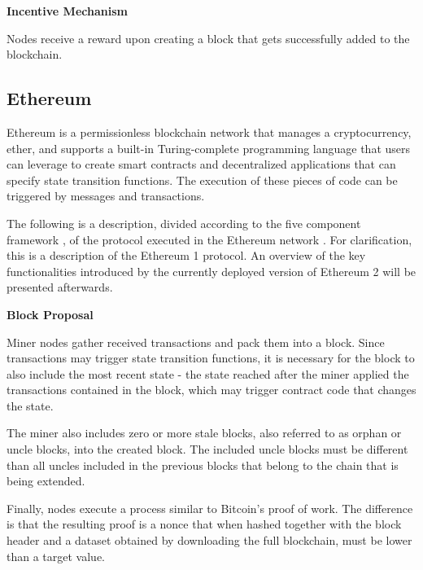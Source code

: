 \vspace{0.25cm}

\textbf{Incentive Mechanism}

Nodes receive a reward upon creating a block that gets successfully added to the blockchain.





\subsection{Ethereum}

Ethereum \cite{ethereum_whitepaper} \cite{ethereum_yellowpaper} is a permissionless blockchain network that manages a cryptocurrency, ether, and supports a built-in Turing-complete programming language that users can leverage to create smart contracts and decentralized applications that can specify state transition functions. The execution of these pieces of code can be triggered by messages and transactions.

The following is a description, divided according to the five component framework \cite{survey_bchain_networks}, of the protocol executed in the Ethereum network \cite{ethereum_whitepaper} \cite{ethereum_yellowpaper}. For clarification, this is a description of the Ethereum 1 protocol. An overview of the key functionalities introduced by the currently deployed version of Ethereum 2 \cite{eth2} will be presented afterwards.


\vspace{0.5cm}

\textbf{Block Proposal}

Miner nodes gather received transactions and pack them into a block. Since transactions may trigger state transition functions, it is necessary for the block to also include the most recent state - the state reached after the miner applied the transactions contained in the block, which may trigger contract code that changes the state.

The miner also includes zero or more stale blocks, also referred to as orphan or uncle blocks, into the created block. The included uncle blocks must be different than all uncles included in the previous blocks that belong to the chain that is being extended.

Finally, nodes execute a process similar to Bitcoin’s proof of work. The difference is that the resulting proof is a nonce that when hashed together with the block header and a dataset obtained by downloading the full blockchain, must be lower than a target value.

